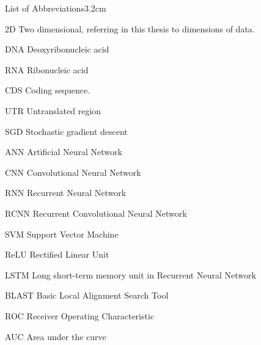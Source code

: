 \begin{mclistof}{List of Abbreviations}{3.2cm}

\item[2D] Two dimensional, referring in this thesis to dimensions of data.

\item[DNA] Deoxyribonucleic acid

\item[RNA] Ribonucleic acid

\item[CDS] Coding sequence.

\item[UTR] Untranslated region

\item[SGD] Stochastic gradient descent

\item[ANN] Artificial Neural Network

\item[CNN] Convolutional Neural Network

\item[RNN] Recurrent Neural Network

\item[RCNN] Recurrent Convolutional Neural Network

\item[SVM] Support Vector Machine

\item[ReLU] Rectified Linear Unit

\item[LSTM] Long short-term memory unit in Recurrent Neural Network

\item[BLAST] Basic Local Alignment Search Tool

\item[ROC] Receiver Operating Characteristic

\item[AUC] Area under the curve

\end{mclistof}
